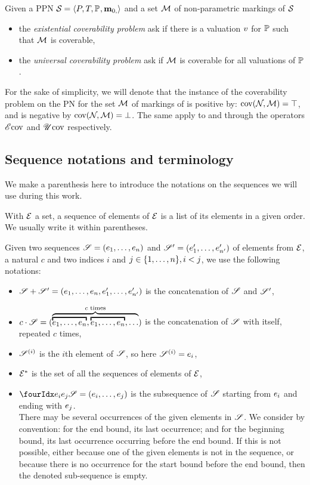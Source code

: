 \begin{defi}
  Given a \ac{PPN} $\mathcal{S}_{} = \left\langle P_{}, T_{}, \mathbb{P}_{}, \mathbf{m}_{0,}\right\rangle$ and a set $\mathcal{M}$ of non-parametric markings of $\mathcal{S}_{}$
  \begin{itemize}
    \item the \emph{existential coverability problem} ask if there is a valuation $\val$ for $\mathbb{P}$ such that $\mathcal{M}$ is coverable,
    \item the \emph{universal   coverability problem} ask if $\mathcal{M}$ is coverable for all valuations of $\mathbb{P}$.
  \end{itemize}
\end{defi}

For the sake of simplicity, we will denote that the instance of the coverability problem on the \ac{PN} \namePN for the set $\mathcal{M}$ of markings of \namePN is positive by: $\operatorname{cov}(\mathcal{N}_{}, \mathcal{M}) = \top$, and is negative by $\operatorname{cov}(\mathcal{N}_{}, \mathcal{M}) = \bot$. The same apply to \Ecov and \Ucov through the operators $\operatorname{\mathscr{E}cov}$ and $\operatorname{\mathscr{U}cov}$ respectively.

\subsection{Sequence notations and terminology}

We make a parenthesis here to introduce the notations on the sequences we will use during this work.

With $\mathcal{E}$ a set, a sequence of elements of $\mathcal{E}$ is a list of its elements in a given order.
We usually write it within parentheses.

Given two sequences $\defSeq{1}{n}$ and $\defSeq[\seq'][\sit']{1}{n'}$ of elements from $\mathcal{E}$, a natural $c$ and two indices $i$ and $j \in \{1, \dots, n\}, i < j$, we use the following notations:
\begin{itemize}
  \item $\seq \concat \seq' = (\elemsSeq{1}{n}, \elemsSeq[\sit']{1}{n'})$ is the concatenation of $\seq$ and $\seq'$,
  \item $c \cdot \seq = (\overbrace{\overbracket{\elemsSeq{1}{n}}, \overbracket{\elemsSeq{1}{n}}, {\dots}}^{c \text{ times}})$ is the concatenation of $\seq$ with itself, repeated $c$ times,
  \item $\seq[i]$ is the $i$th element of $\seq$, so here $\seq[i] = \sit_i$, 
  \item $\mathcal{E}^*$ is the set of all the sequences of elements of $\mathcal{E}$,
  \item $\slice{\sit_i}{\sit_j} = \bodySeq{i}{j}$ is the subsequence of $\seq$ starting from $e_i$ and ending with $e_j$.\\
    There may be several occurrences of the given elements in $\seq$.
    We consider by convention: for the end bound, its last occurrence; and for the beginning bound, its last occurrence occurring before the end bound.
    If this is not possible, either because one of the given elements is not in the sequence, or because there is no occurrence for the start bound before the end bound, then the denoted sub-sequence is empty.
\end{itemize}



